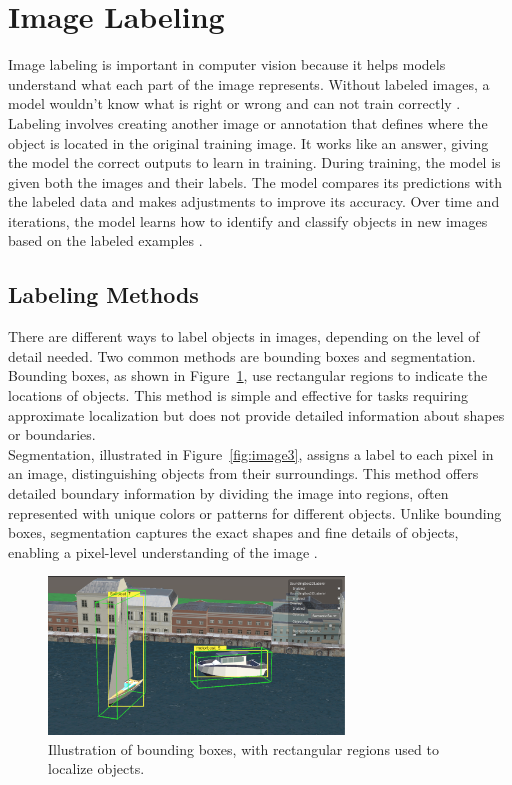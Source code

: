 \section{Image Labeling}
Image labeling is important in computer vision because it helps models understand what each part of the image represents. Without labeled images, a model wouldn’t know what is right or wrong and can not train correctly \cite{Labelling}.\\

\noindent Labeling involves creating another image or annotation that defines where the object is located in the original training image. It works like an answer, giving the model the correct outputs to learn in training. During training, the model is given both the images and their labels. The model compares its predictions with the labeled data and makes adjustments to improve its accuracy. Over time and iterations, the model learns how to identify and classify objects in new images based on the labeled examples \cite{Labelling}.


\subsection{Labeling Methods}

There are different ways to label objects in images, depending on the level of detail needed. Two common methods are bounding boxes and segmentation.\\

\noindent Bounding boxes, as shown in Figure~\ref{fig:image2}, use rectangular regions to indicate the locations of objects. This method is simple and effective for tasks requiring approximate localization but does not provide detailed information about shapes or boundaries.\\

\noindent Segmentation, illustrated in Figure~\ref{fig:image3}, assigns a label to each pixel in an image, distinguishing objects from their surroundings. This method offers detailed boundary information by dividing the image into regions, often represented with unique colors or patterns for different objects. Unlike bounding boxes, segmentation captures the exact shapes and fine details of objects, enabling a pixel-level understanding of the image \cite{labelingMethods}.\

\begin{figure}[H]
    \centering
    \includegraphics[width=0.7\textwidth]{Figures/boundingbox.png}
    \caption{Illustration of bounding boxes, with rectangular regions used to localize objects.}
    \label{fig:image2}
\end{figure}

